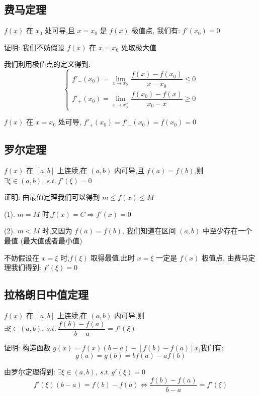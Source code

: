 \subsection{费马定理}
\begin{theorem}[费马定理]

	$f(x)$ 在 $x_{0}$ 处可导,且 $x=x_{0}$ 是 $f(x)$ 极值点, 我们有: $f'(x_{0})=0$

	证明: 我们不妨假设 $f(x)$ 在 $x=x_{0}$ 处取极大值

	我们利用极值点的定义得到:
	$$ \left\lbrace
		\begin{array}{l}
			f'_{-}(x_{0})=\lim\limits_{x\rightarrow x_{0}^{-}}\dfrac{f(x)-f(x_{0})}{x-x_{0}}\leq 0 \\
			f'_{+}(x_{0})=\lim\limits_{x\rightarrow x_{0}^{+}}\dfrac{f(x_{0})-f(x)}{x_{0}-x}\geq 0
		\end{array}
		\right. $$

	$f(x)$ 在 $x=x_{0}$ 处可导, $f'_{+}(x_{0})=f'_{-}(x_{0})=f(x_{0})=0$
\end{theorem}
\subsection{罗尔定理}
\begin{theorem}[罗尔定理]

	$f(x)$ 在 $[a,b]$ 上连续,在 $(a,b)$ 内可导,且 $f(a)=f(b)$,则 $\exists \xi\in(a,b),\ s.t.\ f'(\xi)=0$

	证明: 由最值定理我们可以得到 $m\leq f(x)\leq M$

	(1). $m=M$ 时,$f(x) = C \Rightarrow f'(x)=0$

	(2). $m<M$ 时,又因为 $f(a)=f(b)$, 我们知道在区间 $(a,b)$ 中至少存在一个最值 (最大值或者最小值)

	不妨假设在 $x=\xi$ 时,$f(\xi)$ 取得最值,此时 $x=\xi$ 一定是 $f(x)$ 极值点, 由费马定理我们得到: $f'(\xi)=0$

\end{theorem}
\subsection{拉格朗日中值定理}
\begin{theorem}[拉格朗日中值定理]

	$f(x)$ 在 $[a,b]$ 上连续,在 $(a,b)$ 内可导,则 $\exists \xi\in(a,b),\ s.t.\ \dfrac{f(b)-f(a)}{b-a}=f'(\xi)$

	证明: 构造函数 $g(x)=f(x)(b-a)-[f(b)-f(a)]x$,我们有:
	$$g(a)=g(b)=bf(a)-af(b)$$

	由罗尔定理得到:
	$\exists \xi\in(a,b),\ s.t.\ g'(\xi)=0$
	$$ f'(\xi)(b-a)=f(b)-f(a)\Leftrightarrow  \frac{f(b)-f(a)}{b-a}=f'(\xi)$$
\end{theorem}
